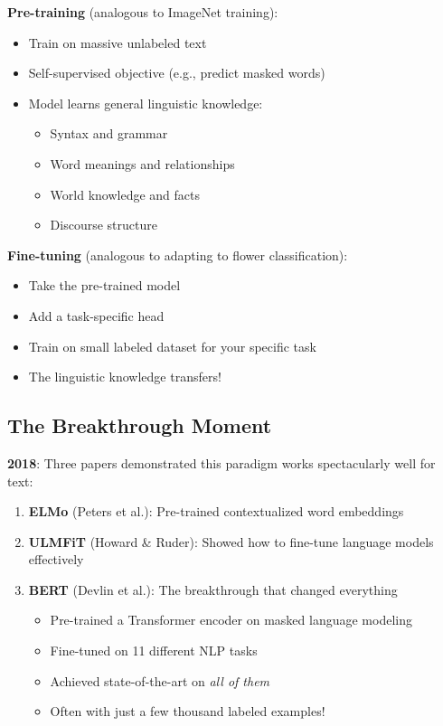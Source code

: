 \documentclass{article}
\begin{document}
\textbf{Pre-training} (analogous to ImageNet training):
\begin{itemize}
\item Train on massive unlabeled text
\item Self-supervised objective (e.g., predict masked words)
\item Model learns general linguistic knowledge:
\begin{itemize}
\item Syntax and grammar
\item Word meanings and relationships
\item World knowledge and facts
\item Discourse structure
\end{itemize}
\end{itemize}

\textbf{Fine-tuning} (analogous to adapting to flower classification):
\begin{itemize}
\item Take the pre-trained model
\item Add a task-specific head
\item Train on small labeled dataset for your specific task
\item The linguistic knowledge transfers!
\end{itemize}

\subsection{The Breakthrough Moment}

\textbf{2018}: Three papers demonstrated this paradigm works spectacularly well for text:

\begin{enumerate}
\item \textbf{ELMo} (Peters et al.): Pre-trained contextualized word embeddings

\item \textbf{ULMFiT} (Howard \& Ruder): Showed how to fine-tune language models effectively

\item \textbf{BERT} (Devlin et al.): The breakthrough that changed everything
\begin{itemize}
\item Pre-trained a Transformer encoder on masked language modeling
\item Fine-tuned on 11 different NLP tasks
\item Achieved state-of-the-art on \textit{all of them}
\item Often with just a few thousand labeled examples!
\end{itemize}
\end{enumerate}
\end{document}
